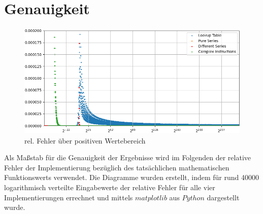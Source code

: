\documentclass[course=erap] {aspdoc}
\begin{document}
    \section{Genauigkeit}\label{sec:genauigkeit}

    \begin{figure}[h]
        \centering
        \includegraphics[width=12cm,height=5.5cm]{images/Figure3}
        \caption{rel. Fehler über positiven Wertebereich}
    \end{figure}


    Als Maßstab für die Genauigkeit der Ergebnisse wird im Folgenden der relative Fehler der Implementierung bezüglich des tatsächlichen mathematischen Funktionswerts verwendet.
    Die Diagramme wurden erstellt, indem für rund 40000 logarithmisch verteilte Eingabewerte der relative Fehler für alle vier Implementierungen errechnet und mittels $matplotlib$ aus $Python$ dargestellt wurde.
\end{document}
